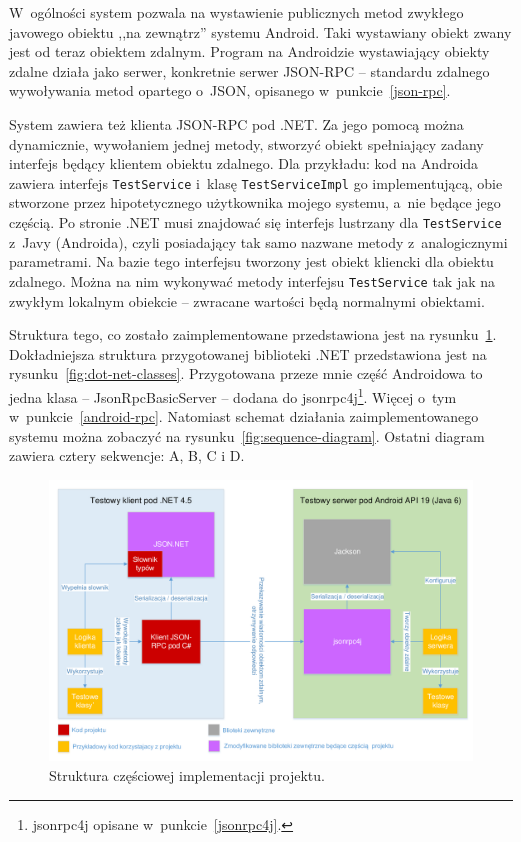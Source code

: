 W~ogólności system pozwala na wystawienie publicznych metod zwykłego javowego obiektu ,,na zewnątrz'' systemu Android.
Taki wystawiany obiekt zwany jest od teraz obiektem zdalnym.
Program na Androidzie wystawiający obiekty zdalne działa jako serwer, konkretnie serwer JSON-RPC -- standardu zdalnego wywoływania metod opartego o~JSON, opisanego w~punkcie~\ref{json-rpc}.

System zawiera też klienta JSON-RPC pod .NET. Za jego pomocą można dynamicznie, wywołaniem jednej metody, stworzyć obiekt spełniający zadany interfejs będący klientem obiektu zdalnego.
Dla przykładu: kod na Androida zawiera interfejs \texttt{TestService} i~klasę \texttt{TestServiceImpl} go implementującą, obie stworzone przez hipotetycznego użytkownika mojego systemu, a~nie będące jego częścią.
Po stronie .NET musi znajdować się interfejs lustrzany dla \texttt{TestService} z~Javy (Androida), czyli posiadający tak samo nazwane metody z~analogicznymi parametrami.
Na bazie tego interfejsu tworzony jest obiekt kliencki dla obiektu zdalnego. Można na nim wykonywać metody interfejsu \texttt{TestService} tak jak na zwykłym lokalnym obiekcie -- zwracane wartości będą normalnymi obiektami.

Struktura tego, co zostało zaimplementowane przedstawiona jest na rysunku~\ref{fig:implementation-overview}.
Dokładniejsza struktura przygotowanej biblioteki .NET przedstawiona jest na rysunku~\ref{fig:dot-net-classes}.
Przygotowana przeze mnie część Androidowa to jedna klasa -- JsonRpcBasicServer -- dodana do jsonrpc4j\footnote{jsonrpc4j opisane w~punkcie~\ref{jsonrpc4j}.}. Więcej o~tym w~punkcie~\ref{android-rpc}.
Natomiast schemat działania zaimplementowanego systemu można zobaczyć na rysunku~\ref{fig:sequence-diagram}.
Ostatni diagram zawiera cztery sekwencje: A, B, C i D.
\begin{figure}
	\centering
		\includegraphics[width=\textwidth]{img/schematy/schemat-implementacji.pdf}
	\caption{Struktura częściowej implementacji projektu.}
	\label{fig:implementation-overview}
\end{figure}

